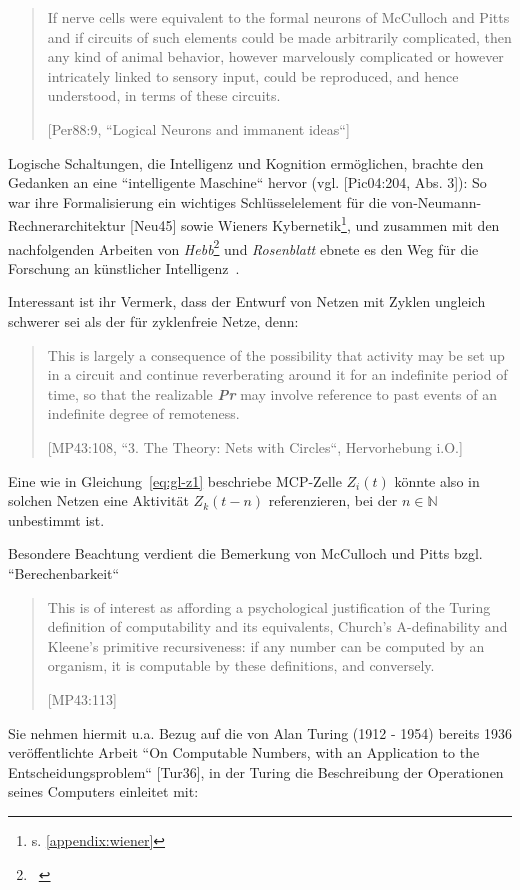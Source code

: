 {\blockquote[{[Per88:9, ``Logical Neurons and immanent ideas``]}]{
If nerve cells were equivalent to the formal neurons of McCulloch and Pitts and if circuits of such elements could be made arbitrarily complicated, then any kind of animal behavior, however marvelously complicated or however intricately linked to sensory input, could be reproduced, and hence understood, in terms of these circuits.
}

Logische Schaltungen, die Intelligenz und Kognition ermöglichen, brachte den Gedanken an eine ``intelligente Maschine`` hervor (vgl. [Pic04:204, Abs. 3]): So war ihre Formalisierung ein wichtiges Schlüsselelement für die von-Neumann-Rechnerarchitektur [Neu45] sowie Wieners Kybernetik\footnote{s. \ref{appendix:wiener}}, und zusammen mit den nachfolgenden Arbeiten von \textit{Hebb}\footnote{~\cite{Heb49}} und \textit{Rosenblatt} ebnete es den Weg für die Forschung an künstlicher Intelligenz~\cite[1]{Arb19}.

\noindent
Interessant ist ihr Vermerk, dass der Entwurf von Netzen mit Zyklen ungleich schwerer sei als der für zyklenfreie Netze, denn:

\blockquote[{[MP43:108, ``3. The Theory: Nets with Circles``, Hervorhebung i.O.]}]{
 This is largely a consequence of the possibility that activity may be set up in a circuit and continue reverberating around it for an indefinite period of time, so that the realizable \textbf{\textit{Pr}} may involve reference to past events of an indefinite degree of remoteness.
}

\noindent
Eine wie in Gleichung~\ref{eq:gl-z1} beschriebe MCP-Zelle $Z_i(t)$ könnte also in solchen Netzen eine Aktivität $Z_k(t-n)$ referenzieren, bei der $n \in \mathbb{N}$ unbestimmt ist.

\noindent
Besondere Beachtung verdient die Bemerkung von McCulloch und Pitts bzgl. ``Berechenbarkeit``

\blockquote[{[MP43:113]}]{
This is of interest as affording a psychological justification of the Turing definition of computability and its equivalents, Church’s A-definability and Kleene’s primitive recursiveness: if any number can be computed by an organism, it is computable by these definitions, and conversely.
}

\noindent
Sie nehmen hiermit u.a. Bezug auf die von Alan Turing (1912 - 1954) bereits 1936 veröffentlichte Arbeit ``On Computable Numbers, with an Application to the Entscheidungsproblem`` [Tur36], in der Turing die Beschreibung der Operationen seines Computers einleitet mit:

}
